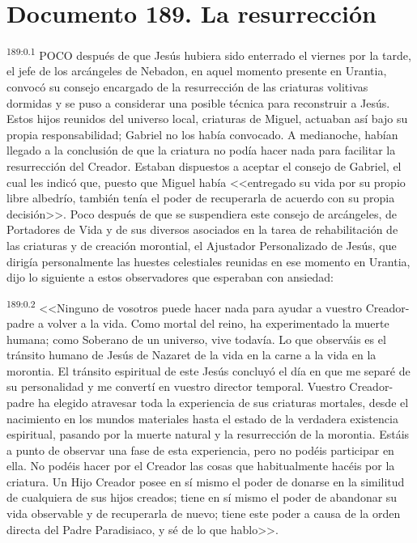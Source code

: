 \chapter{Documento 189. La resurrección}
\par 
\textsuperscript{189:0.1} POCO después de que Jesús hubiera sido enterrado el viernes por la tarde, el jefe de los arcángeles de Nebadon, en aquel momento presente en Urantia, convocó su consejo encargado de la resurrección de las criaturas volitivas dormidas y se puso a considerar una posible técnica para reconstruir a Jesús. Estos hijos reunidos del universo local, criaturas de Miguel, actuaban así bajo su propia responsabilidad; Gabriel no los había convocado. A medianoche, habían llegado a la conclusión de que la criatura no podía hacer nada para facilitar la resurrección del Creador. Estaban dispuestos a aceptar el consejo de Gabriel, el cual les indicó que, puesto que Miguel había <<entregado su vida por su propio libre albedrío, también tenía el poder de recuperarla de acuerdo con su propia decisión>>. Poco después de que se suspendiera este consejo de arcángeles, de Portadores de Vida y de sus diversos asociados en la tarea de rehabilitación de las criaturas y de creación morontial, el Ajustador Personalizado de Jesús, que dirigía personalmente las huestes celestiales reunidas en ese momento en Urantia, dijo lo siguiente a estos observadores que esperaban con ansiedad:

\par 
\textsuperscript{189:0.2} <<Ninguno de vosotros puede hacer nada para ayudar a vuestro Creador-padre a volver a la vida. Como mortal del reino, ha experimentado la muerte humana; como Soberano de un universo, vive todavía. Lo que observáis es el tránsito humano de Jesús de Nazaret de la vida en la carne a la vida en la morontia. El tránsito espiritual de este Jesús concluyó el día en que me separé de su personalidad y me convertí en vuestro director temporal. Vuestro Creador-padre ha elegido atravesar toda la experiencia de sus criaturas mortales, desde el nacimiento en los mundos materiales hasta el estado de la verdadera existencia espiritual, pasando por la muerte natural y la resurrección de la morontia. Estáis a punto de observar una fase de esta experiencia, pero no podéis participar en ella. No podéis hacer por el Creador las cosas que habitualmente hacéis por la criatura. Un Hijo Creador posee en sí mismo el poder de donarse en la similitud de cualquiera de sus hijos creados; tiene en sí mismo el poder de abandonar su vida observable y de recuperarla de nuevo; tiene este poder a causa de la orden directa del Padre Paradisiaco, y sé de lo que hablo>>.

